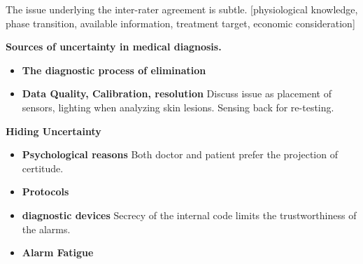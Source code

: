 \documentclass[9pt,twocolumn,twoside]{pnas-new}
\begin{document}


    The issue underlying the inter-rater agreement is
  subtle. [physiological knowledge, phase transition, available
  information, treatment target, economic consideration]

\iffalse
  \Medicine{Inter-Rater agreement}{
  A direct consequence of this low inter-rater agreement is a
  questionable trained ``artificial intelligence''. It is possible
  that we magically obtain a dataset that contains information that is
  sufficient for the decision making, while the information is too
  subtle so that it is not considered in the protocol, and we also
  magically obtain labels from a magical master that can see though
  all the information and provide the correct decision. However, by
  doing a simple math, we shall not count on such a magic and should
  come back to the protocol itself.

  \yoav{ Can you describe a particular interesting / illuminating /
    convincing case?}
}
\fi


{\bf Sources of uncertainty in medical diagnosis.}
\begin{itemize}
  \item{\bf The diagnostic process of elimination}
  \item{\bf Data Quality, Calibration, resolution} Discuss issue as
    placement of sensors, lighting when analyzing skin lesions. Sensing back for re-testing.
  \end{itemize}

 {\bf Hiding Uncertainty}
  \begin{itemize}
    \item {\bf Psychological reasons} Both doctor and patient prefer
      the projection of certitude.
    \item {\bf Protocols}
    \item {\bf diagnostic devices} Secrecy of the internal code limits
      the trustworthiness of the alarms.
    \item{\bf Alarm Fatigue}
  \end{itemize}
\end{document}

